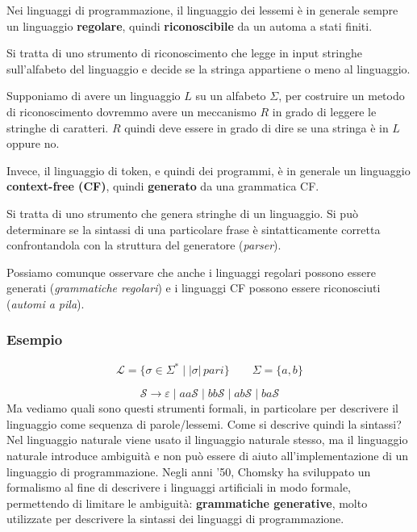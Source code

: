 \documentclass[oneside,a4paper,11pt]{book}
\theoremstyle{italicstyle}
\theoremstyle{normStyle}
\begin{document}
Nei linguaggi di programmazione, il linguaggio dei lessemi 
è in generale sempre un linguaggio \textbf{regolare}, quindi 
\textbf{riconoscibile} da un automa a stati finiti.
\begin{tcolorbox}[title={Riconoscitore}]
Si tratta di uno strumento di riconoscimento che legge in 
input stringhe sull'alfabeto del linguaggio e decide se la 
stringa appartiene o meno al linguaggio.
\end{tcolorbox}
Supponiamo di avere un linguaggio $L$ su un alfabeto $\Sigma$, per 
costruire un metodo di riconoscimento dovremmo avere un meccanismo 
$R$ in grado di leggere le stringhe di caratteri. $R$ quindi deve essere in 
grado di dire se una stringa è in $L$ oppure no.

Invece, il linguaggio di token, e quindi dei programmi, è in generale
un linguaggio \textbf{context-free (CF)}, quindi \textbf{generato} da 
una grammatica CF.
\begin{tcolorbox}[title={Generatore}]
Si tratta di uno strumento che genera stringhe di un linguaggio. 
Si può determinare se la sintassi di una particolare
frase è sintatticamente corretta confrontandola con la struttura 
del generatore (\textit{parser}).
\end{tcolorbox}
Possiamo comunque osservare che anche i linguaggi regolari possono essere 
generati (\textit{grammatiche regolari}) e i linguaggi 
CF possono essere riconosciuti (\textit{automi a pila}).
\subsubsection{Esempio}
\[
\mathcal{L}=\{\sigma \in \Sigma^* \mid |\sigma|\, pari \}\qquad\Sigma=\{a,b\}
\]
\begin{figure}[H]
  \begin{center}
  \end{center}
\end{figure}
\[
\mathcal{S} \longrightarrow \varepsilon \mid aa\mathcal{S} \mid bb\mathcal{S} \mid ab\mathcal{S} \mid ba\mathcal{S}
\]
Ma vediamo quali sono questi strumenti formali, in particolare 
per descrivere il linguaggio come sequenza di parole/lessemi.
Come si descrive quindi la sintassi? Nel linguaggio naturale 
viene usato il linguaggio naturale stesso, ma il linguaggio naturale 
introduce ambiguità e non può essere di aiuto all'implementazione di 
un linguaggio di programmazione. Negli anni '50, Chomsky ha 
sviluppato un formalismo al fine di descrivere i linguaggi artificiali in 
modo formale, permettendo di limitare le ambiguità: \textbf{grammatiche 
generative}, molto utilizzate per descrivere la sintassi dei linguaggi di 
programmazione.
\end{document}

